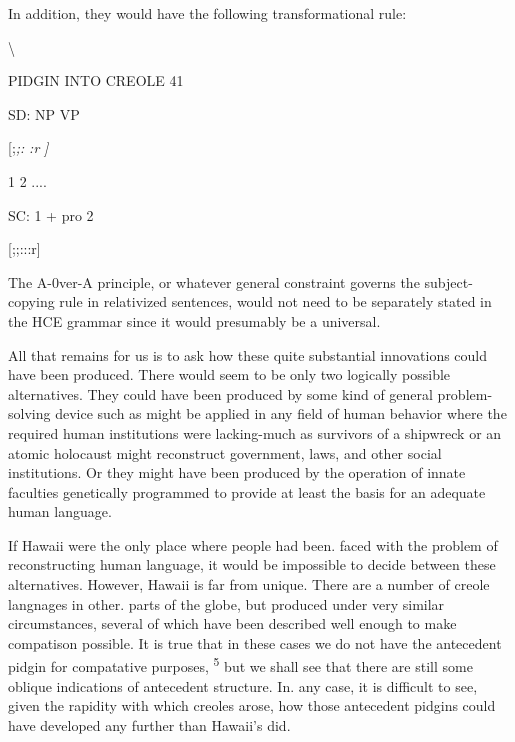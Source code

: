 In addition, they would have the following transformational rule:

{\textbackslash}

PIDGIN INTO CREOLE 41

\ea\label{ex:111}
SD: NP VP
\glt
\z

[;\textit{;}\textit{:} \textit{:r} \textit{]}

1 2 ....

SC: 1 + pro 2

[;;:::r]

The A-0ver-A principle, or whatever general constraint governs the subject-copying rule in relativized sentences, would not need to be separately stated in the HCE grammar since it would presumably be a universal.

All that remains for us is to ask how these quite substantial innovations could have been produced. There would seem to be only two logically possible alternatives. They could have been produced by some kind of general problem-solving device such as might be applied in any field of human behavior where the required human institutions were lacking-much as survivors of a shipwreck or an atomic holocaust might reconstruct government, laws, and other social institutions. Or they might have been produced by the operation of innate faculties genetically programmed to provide at least the basis for an adequate human language.

If Hawaii were the only place where people had been. faced with the problem of reconstructing human language, it would be impossible to decide between these alternatives. However, Hawaii is far from unique. There are a number of creole langnages in other. parts of the globe, but produced under very similar circumstances, several of which have been described well enough to make compatison possible. It is true that in these cases we do not have the antecedent pidgin for compatative purposes, \textsuperscript{5} but we shall see that there are still some oblique indications of antecedent structure. In. any case, it is difficult to see, given the rapidity with which creoles arose, how those antecedent pidgins could have developed any further than Hawaii's did.


